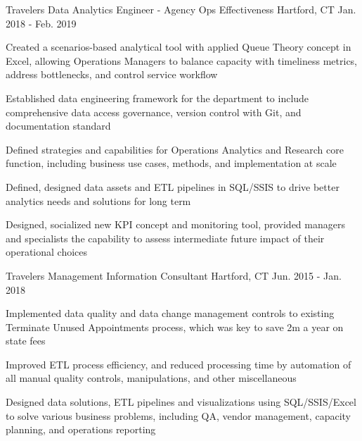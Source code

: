 \begin{cventries}
  \cventry
    {Travelers} %
    {Data Analytics Engineer - Agency Ops Effectiveness} %
    {Hartford, CT} %
    {Jan. 2018 - Feb. 2019} %
    {
      \begin{cvitems} %
      \item {Created a scenarios-based analytical tool with applied Queue Theory concept in Excel, allowing Operations Managers
      to balance capacity with timeliness metrics, address bottlenecks, and control service workflow}
      \item {Established data engineering framework for the department to include comprehensive data access 
      governance, version control with Git, and documentation standard}
      \item {Defined strategies and capabilities for Operations Analytics and Research core function, including 
      business use cases, methods, and implementation at scale}
      \item {Defined, designed data assets and ETL pipelines in SQL/SSIS to drive better analytics needs and solutions for 
      long term}
      \item {Designed, socialized new KPI concept and monitoring tool, provided managers and specialists the 
      capability to assess intermediate future impact of their operational choices}
      \end{cvitems}
    }

  \cventry
    {Travelers} %
    {Management Information Consultant} %
    {Hartford, CT} %
    {Jun. 2015 - Jan. 2018} %
    {
      \begin{cvitems} %
        \item {Implemented data quality and data change management controls to existing Terminate Unused Appointments 
        process, which was key to save 2m a year on state fees}
        \item {Improved ETL process efficiency, and reduced processing time by automation of all manual quality controls, 
        manipulations, and other miscellaneous}
        \item {Designed data solutions, ETL pipelines and visualizations using SQL/SSIS/Excel to solve various business 
        problems, including QA, vendor management, capacity planning, and operations reporting}
      \end{cvitems}
    }


\end{cventries}

